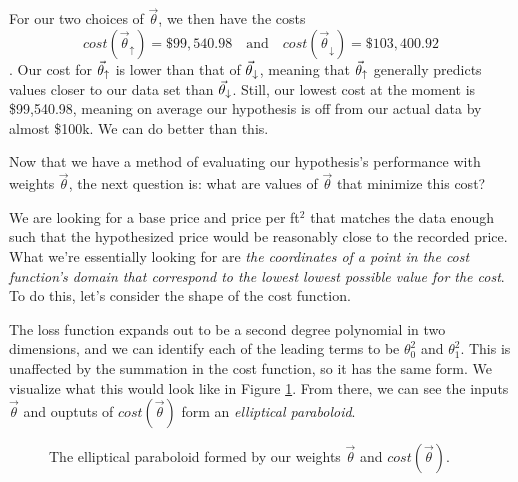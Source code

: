For our two choices of $\vec\theta$, we then have the costs
\begin{equation*}
	cost(\vec\theta_{\uparrow})= \$99,540.98 \quad \text{and} \quad cost(\vec\theta_{\downarrow}) = \$103,400.92
\end{equation*}
. Our cost for $\vec\theta_{\uparrow}$ is lower than that of $\vec\theta_{\downarrow}$, meaning that $\vec\theta_{\uparrow}$ generally predicts values closer to our data set than $\vec\theta_{\downarrow}$. Still, our lowest cost at the moment is \$99,540.98, meaning on average our hypothesis is off from our actual data by almost \$100k. We can do better than this.

Now that we have a method of evaluating our hypothesis's performance with weights $\vec\theta$, the next question is: what are values of $\vec\theta$ that minimize this cost?

We are looking for
a base price and price per ft$^2$ that matches the data enough such that the
hypothesized price would be reasonably close to the recorded price. What we're
essentially looking for are \emph{the coordinates of a point in the cost
function's domain that correspond to the lowest lowest possible value for the
cost}. To do this, let's consider the shape of the cost function.

The loss function expands out to be a second degree polynomial in two
dimensions, and we can identify each of the leading terms to be $\theta_0^2$ and
$\theta_1^2$. This is unaffected by the summation in the cost function, so it
has the same form. We visualize what this would look like in
Figure
\ref{fig:cost}. From there, we can see the inputs $\vec\theta$ and ouptuts of
$cost(\vec\theta)$ form an \emph{elliptical paraboloid}.

\begin{figure}[t!]
    \centering
    \caption{The elliptical paraboloid formed by our weights $\vec\theta$ and $cost(\vec\theta)$.}
    \label{fig:cost}
\end{figure}


